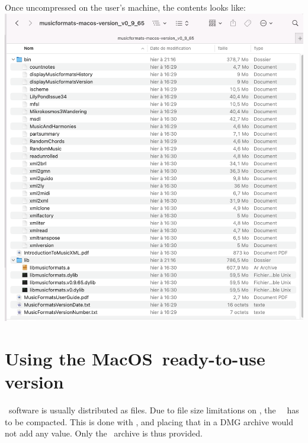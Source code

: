 Once uncompressed on the user's machine, the contents looks like:\\
\includegraphics[scale=0.5]{../graphics/ReadyToUseVersionContentsExample.png}


\section{Using the MacOS\texttrademark\ ready-to-use version}

\MacOS\ software is usually distributed as  files. Due to file size limitations on \github, the \MacOS\ \readyToUseVersion\ has to be compacted. This is done with \zip, and placing that in a DMG archive would not add any value. Only the \zip\ archive is thus provided.


